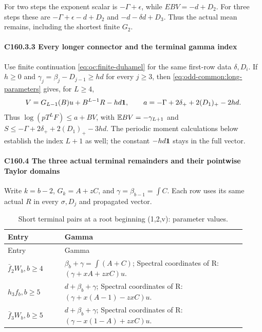 For two steps the exponent scalar is \(-\Gamma+\epsilon\), while \(EBV=-d+D_2\). For three steps these are \(-\Gamma+\epsilon-d+D_2\) and \(-d-\delta d+D_3\). Thus the actual mean remains, including the shortest finite \(G_2\).

\paragraph{C160.3.3 Every longer connector and the terminal gamma index}

Use finite continuation \eqref{eq:oc:finite-duhamel} for the same
first-row data \(\delta,D_i\).
If \(h\ge0\) and \(\gamma_j=\beta_j-D_{j-1}\ge hd\) for every
\(j\ge3\), then \eqref{eq:odd-common:long-parameters} gives, for
\(L\ge4\),
\[
 V=G_{L-1}(B)u+B^{L-1}R-hd\mathbf1,\qquad
 a=-\Gamma+2\delta_++2(D_1)_+-2hd.
\]
Thus \(\log(pT^LF)\le a+BV\), with
\(\mathbb E BV=-\gamma_{L+1}\) and
\(S\le-\Gamma+2\delta_++2(D_1)_+-3hd\).
The periodic moment calculations below establish the index \(L+1\)
as well; the constant \(-hd\mathbf1\) stays in the full vector.

\paragraph{C160.4 The three actual terminal remainders and their pointwise Taylor domains}\label{part:C160.4}

Write \(k=b-2\), \(G_k=A+zC\), and \(\gamma=\beta_{b-1}=\int C\). Each row uses its same actual \(R\) in every \(\sigma,\allowbreak \allowbreak  D_j\) and propagated vector.


\begingroup\small
\setlength{\tabcolsep}{3pt}
\setlength{\LTleft}{0pt}\setlength{\LTright}{\fill}
\begin{longtable}{@{}p{0.2200\linewidth}p{0.7000\linewidth}@{}}
\caption{Short terminal pairs at a root beginning (1,2,v): parameter values.}\label{tab:parameters:q5-c160:3}\\
\toprule
Entry & Gamma \\
\midrule\endfirsthead
\toprule
Entry & Gamma \\
\midrule\endhead
\bottomrule\endfoot
\(\bar f_2 W_b,\allowbreak  b\ge 4\) & \(\beta_b+\gamma=\int(A+C)\); Spectral coordinates of R: \((\gamma+xA+zxC)u\). \\
\addlinespace[2pt]
\(h_3 f_b,\allowbreak  b\ge 5\) & \(d+\beta_b+\gamma\); Spectral coordinates of R: \((\gamma+x(A-1)-zxC)u\). \\
\addlinespace[2pt]
\(\bar f_3 W_b,\allowbreak  b\ge 5\) & \(d+\beta_b+\gamma\); Spectral coordinates of R: \((\gamma-x(1-A)+zxC)u\). \\
\end{longtable}
\endgroup


